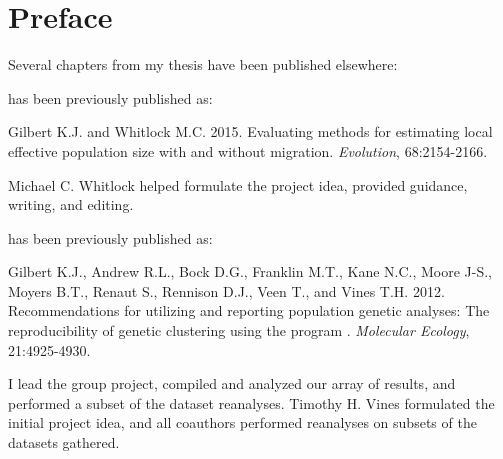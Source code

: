 \chapter*{Preface}

Several chapters from my thesis have been published elsewhere:

\textsc{} has been previously published as:
%
\begin{previouspaper}
  Gilbert K.J. and Whitlock M.C. 2015. Evaluating methods for estimating local effective population size with and without migration. \emph{Evolution}, 68:2154-2166.
\end{previouspaper}
%
Michael C. Whitlock helped formulate the project idea, provided guidance, writing, and editing.

\textsc{} has been previously published as:
%
\begin{previouspaper}
  Gilbert K.J., Andrew R.L., Bock D.G., Franklin M.T., Kane N.C., Moore J-S., Moyers B.T., Renaut S., Rennison D.J., Veen T., and Vines T.H. 2012. Recommendations for utilizing and reporting population genetic analyses: The reproducibility of genetic clustering using the program . \emph{Molecular Ecology}, 21:4925-4930.
\end{previouspaper}
%
I lead the group project, compiled and analyzed our array of results, and performed a subset of the dataset reanalyses. Timothy H. Vines formulated the initial project idea, and all coauthors performed reanalyses on subsets of the datasets gathered.

